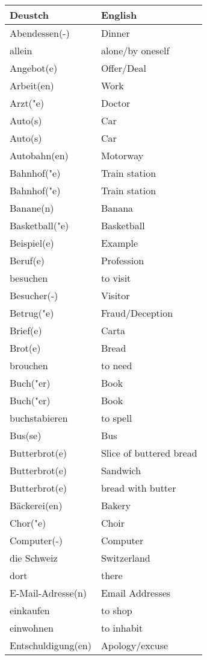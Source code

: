 \documentclass{article}
\renewcommand{\arraystretch}{1}
\begin{document}
\begin{minipage}{0.48\textwidth}
    \centering
    \renewcommand{\arraystretch}{1.5}
    \begin{tabular}{|>{\raggedright\arraybackslash}p{3.5cm}|>{\raggedright\arraybackslash}p{3.5cm}|}
        \hline
        \rowcolor{gray!20} \textbf{Deustch} & \textbf{English} \\
        \hline
        Abendessen(-) & Dinner \\\hline
        allein & alone/by oneself \\\hline
        Angebot(e) & Offer/Deal \\\hline
        Arbeit(en) & Work \\\hline
        Arzt("e) & Doctor \\\hline
        Auto(s) & Car \\\hline
        Auto(s) & Car \\\hline
        Autobahn(en) & Motorway \\\hline
        Bahnhof("e) & Train station \\\hline
        Bahnhof("e) & Train station \\\hline
        Banane(n) & Banana \\\hline
        Basketball("e) & Basketball \\\hline
        Beispiel(e) & Example \\\hline
        Beruf(e) & Profession \\\hline
        besuchen & to visit \\\hline
        Besucher(-) & Visitor \\\hline
        Betrug("e) & Fraud/Deception \\\hline
        Brief(e) & Carta \\\hline
        Brot(e) & Bread \\\hline
        brouchen & to need \\\hline
        Buch("er) & Book \\\hline
        Buch("er) & Book \\\hline
        buchstabieren & to spell \\\hline
        Bus(se) & Bus \\\hline
        Butterbrot(e) & Slice of buttered bread \\\hline
        Butterbrot(e) & Sandwich \\\hline
        Butterbrot(e) & bread with butter \\\hline
        Bäckerei(en) & Bakery \\\hline
        Chor("e) & Choir \\\hline
        Computer(-) & Computer \\\hline
        die Schweiz & Switzerland \\\hline
        dort & there \\\hline
        E-Mail-Adresse(n) & Email Addresses \\\hline
        einkaufen & to shop \\\hline
        einwohnen & to inhabit \\\hline
        Entschuldigung(en) & Apology/excuse \\\hline
    \end{tabular}
\end{minipage}%
\end{document}

